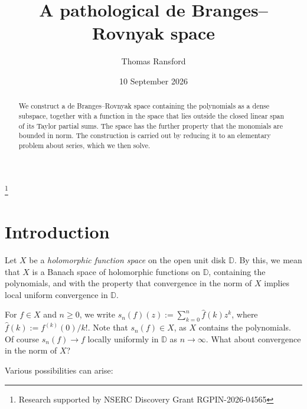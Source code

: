 \documentclass[11pt,reqno]{amsart}
\theoremstyle{plain}
\theoremstyle{definition}
\theoremstyle{remark}
\newcommand{\DD}{\mathbb{D}}
\renewcommand{\hat}{\widehat}
\begin{document}
\title{A pathological de Branges--Rovnyak space}


\author[T. Ransford]{Thomas Ransford}
\address{D\'epartement de math\'ematiques et de statistique, Universit\'e Laval, Qu\'ebec (QC), G1V 0A6, Canada}


\date{10 September 2026}



\begin{abstract}
We construct a de Branges--Rovnyak space containing the polynomials as a dense subspace, together with a function in the space 
that lies outside the closed linear span of its Taylor partial sums.
The space has the further property that the monomials are bounded in norm. The construction is carried out by reducing it to an elementary problem about series, which
we then  solve.
\end{abstract}

\thanks{Research supported  by NSERC Discovery Grant RGPIN-2026-04565}


\makeatletter
{}
\makeatother


\maketitle

\section{Introduction}\label{S:Intro}

Let $X$ be a \emph{holomorphic function space} on the open unit disk $\DD$.
By this, we mean that $X$ is a Banach space 
of holomorphic functions on $\DD$, containing the polynomials, 
and with the property that convergence in the norm of $X$ implies
local uniform convergence in $\DD$. 

For $f\in X$ and $n\ge0$, we write $s_n(f)(z):=\sum_{k=0}^n \hat{f}(k)z^k$,
where $\hat{f}(k):=f^{(k)}(0)/k!$.
Note that $s_n(f)\in X$, as $X$  contains the polynomials.
Of course $s_n(f)\to f$ locally uniformly in $\DD$ as $n\to\infty$. 
What about convergence in the norm of $X$?


Various possibilities can arise:
\end{document}
